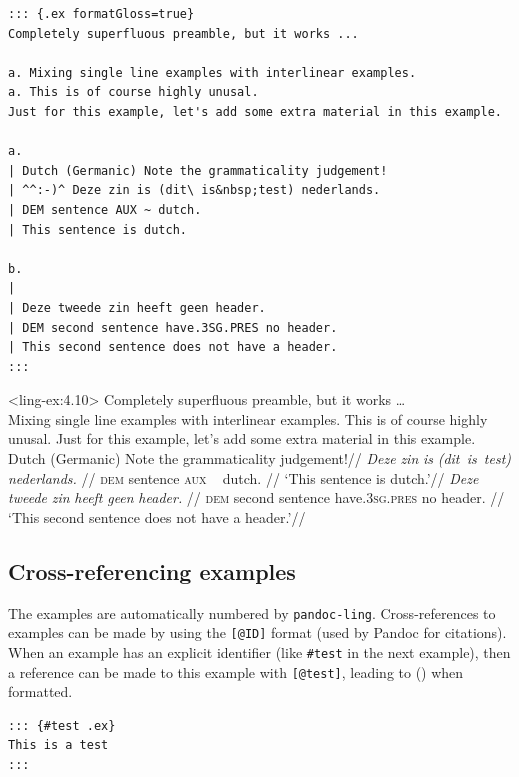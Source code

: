 \documentclass[
]{article}
\begin{document}
\begin{verbatim}
::: {.ex formatGloss=true}
Completely superfluous preamble, but it works ...

a. Mixing single line examples with interlinear examples.
a. This is of course highly unusal.
Just for this example, let's add some extra material in this example.

a.
| Dutch (Germanic) Note the grammaticality judgement!
| ^^:-)^ Deze zin is (dit\ is&nbsp;test) nederlands.
| DEM sentence AUX ~ dutch.
| This sentence is dutch.

b.
|
| Deze tweede zin heeft geen header.
| DEM second sentence have.3SG.PRES no header.
| This second sentence does not have a header.
:::
\end{verbatim}

\pex[*=:-)]<ling-ex:4.10> Completely superfluous preamble, but it works
\ldots{}\\
  \a Mixing single line examples with interlinear examples.
  \a This is of course highly unusal. Just for this example, let's add
some extra material in this example.
  \a 
  \begingl
  \glpreamble Dutch (Germanic) Note the grammaticality judgement!//
  \gla \ljudge{\textsuperscript{:-)}}\emph{Deze} \emph{zin} \emph{is}
\emph{(dit~is~test)} \emph{nederlands.} //
  \glb \textsc{dem} sentence \textsc{aux}  ~  dutch. //
  \glft `This sentence is dutch.'//
  \endgl
  \a 
  \begingl
  \gla \emph{Deze} \emph{tweede} \emph{zin} \emph{heeft} \emph{geen}
\emph{header.} //
  \glb \textsc{dem} second sentence have.\textsc{3sg}.\textsc{pres} no
header. //
  \glft `This second sentence does not have a header.'//
  \endgl
\xe

\hypertarget{cross-referencing-examples}{%
\subsection{Cross-referencing
examples}\label{cross-referencing-examples}}

The examples are automatically numbered by \texttt{pandoc-ling}.
Cross-references to examples can be made by using the \texttt{{[}@ID{]}}
format (used by Pandoc for citations). When an example has an explicit
identifier (like \texttt{\#test} in the next example), then a reference
can be made to this example with \texttt{{[}@test{]}}, leading to
() when formatted.

\begin{verbatim}
::: {#test .ex}
This is a test
:::
\end{verbatim}
\end{document}
